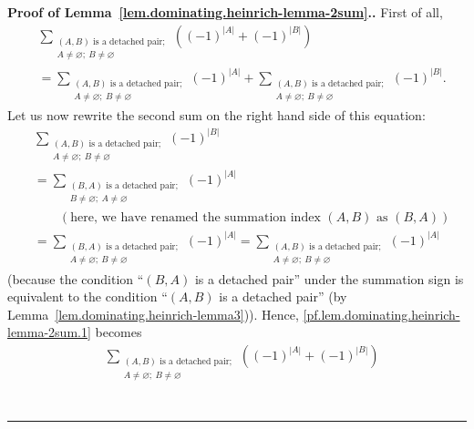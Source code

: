 \documentclass[numbers=enddot,12pt,final,onecolumn,notitlepage]{scrartcl}%
\theoremstyle{definition}
\newenvironment{proof}[1][Proof]{\noindent\textbf{#1.} }{\ \rule{0.5em}{0.5em}}
\let\sumnonlimits\sum
\renewcommand{\sum}{\sumnonlimits\limits}
\newcommand{\abs}[1]{\left| #1 \right|}
\newcommand{\tup}[1]{\left( #1 \right)}
\begin{document}
\begin{proof}[Proof of Lemma~\ref{lem.dominating.heinrich-lemma-2sum}.]
First of all,
\begin{align}
& \sum_{\substack{\tup{A, B} \text{ is a detached pair}; \\
                A \neq \varnothing; \  B \neq \varnothing}}
  \tup{\tup{-1}^{\abs{A}} + \tup{-1}^{\abs{B}}}
\nonumber \\
& =
\sum_{\substack{\tup{A, B} \text{ is a detached pair}; \\
                A \neq \varnothing; \  B \neq \varnothing}}
  \tup{-1}^{\abs{A}}
+
\sum_{\substack{\tup{A, B} \text{ is a detached pair}; \\
                A \neq \varnothing; \  B \neq \varnothing}}
  \tup{-1}^{\abs{B}}
.
\label{pf.lem.dominating.heinrich-lemma-2sum.1}
\end{align}
Let us now rewrite the second sum on the right hand side of
this equation:
\begin{align*}
& \sum_{\substack{\tup{A, B} \text{ is a detached pair}; \\
                A \neq \varnothing; \  B \neq \varnothing}}
  \tup{-1}^{\abs{B}} \\
& =
\sum_{\substack{\tup{B, A} \text{ is a detached pair}; \\
                B \neq \varnothing; \  A \neq \varnothing}}
  \tup{-1}^{\abs{A}} \\
& \qquad
\left( \text{here, we have renamed the summation index }
         \tup{A, B} \text{ as } \tup{B, A} \right) \\
& =
\sum_{\substack{\tup{B, A} \text{ is a detached pair}; \\
                A \neq \varnothing; \  B \neq \varnothing}}
  \tup{-1}^{\abs{A}}
=
\sum_{\substack{\tup{A, B} \text{ is a detached pair}; \\
                A \neq \varnothing; \  B \neq \varnothing}}
  \tup{-1}^{\abs{A}}
\end{align*}
(because the condition
``$\tup{B, A}$ is a detached pair'' under the summation
sign is equivalent to the condition ``$\tup{A, B}$ is a
detached pair'' (by Lemma~\ref{lem.dominating.heinrich-lemma3})).
Hence, \eqref{pf.lem.dominating.heinrich-lemma-2sum.1} becomes
\begin{align*}
&
\sum_{\substack{\tup{A, B} \text{ is a detached pair}; \\
                A \neq \varnothing; \  B \neq \varnothing}}
  \tup{\tup{-1}^{\abs{A}} + \tup{-1}^{\abs{B}}} \\

\end{align*}
\end{proof}
\end{document}
